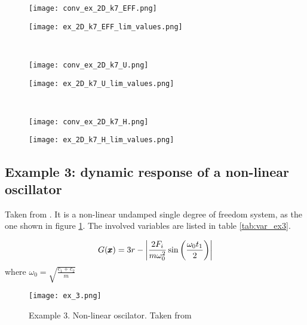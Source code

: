 \begin{figure*}[h]
    \begin{subfigure}{.5\textwidth}
        \centering
        \texttt{[image: conv\_ex\_2D\_k7\_EFF.png]}
      \end{subfigure}%
      \begin{subfigure}{.5\textwidth}
        \centering
        \texttt{[image: ex\_2D\_k7\_EFF\_lim\_values.png]}
      \end{subfigure}%
      \\
      \begin{subfigure}{.5\textwidth}
        \centering
        \texttt{[image: conv\_ex\_2D\_k7\_U.png]}
      \end{subfigure}%
      \begin{subfigure}{.5\textwidth}
        \centering
        \texttt{[image: ex\_2D\_k7\_U\_lim\_values.png]}
      \end{subfigure}%
      \\    \begin{subfigure}{.5\textwidth}
        \centering
        \texttt{[image: conv\_ex\_2D\_k7\_H.png]}
      \end{subfigure}%
      \begin{subfigure}{.5\textwidth}
        \centering
        \texttt{[image: ex\_2D\_k7\_H\_lim\_values.png]}
      \end{subfigure}%
      \caption{Results of example 2 with $k=7$}
      \label{fig:ex2_k7}
\end{figure*}

\clearpage
\newpage
\subsection{Example 3: dynamic response of a non-linear oscillator}
Taken from \citep{Schueremans2005}. It is a non-linear undamped single degree of freedom system, as the
one shown in figure \ref{fig:ex3}. The involved variables are listed in table \ref{tab:var_ex3}.

\begin{equation}
  G(\pmb{x}) = 3r - \left\lvert\frac{2F_i}{m\omega_0^2} \sin{\left( \frac{\omega_0 t_1}{2} \right)} \right\rvert
\end{equation}
where $\omega_0 = \sqrt{\frac{c_1 + c_2}{m}}$

\begin{figure}[h]
    \texttt{[image: ex\_3.png]}
    \caption{Example 3. Non-linear oscilator. Taken from \citep{Schu2005}}
    \label{fig:ex3}
\end{figure}

